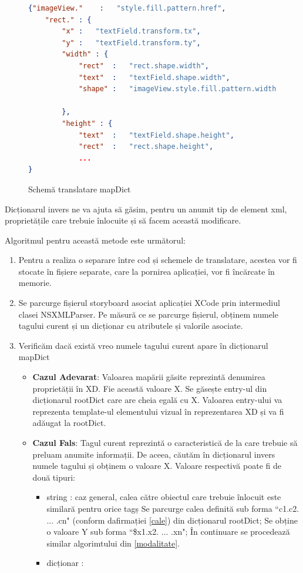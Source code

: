 \begin{figure}[!htbp]
\begin{lstlisting}[language=json,firstnumber=1]
{"imageView."    :   "style.fill.pattern.href",
    "rect." : {
        "x" :   "textField.transform.tx",
        "y" :   "textField.transform.ty",
        "width" : {
            "rect"  :   "rect.shape.width",
            "text"  :   "textField.shape.width",
            "shape" :   "imageView.style.fill.pattern.width"
        
        },
        "height" : {
            "text"  :   "textField.shape.height",
            "rect"  :   "rect.shape.height",
            ...
}
\end{lstlisting}
\caption{Schemă translatare mapDict} \label{fig:MapDict Schema}
\end{figure}


Dicționarul invers ne va ajuta să găsim, pentru un anumit tip de element xml, proprietățile care trebuie înlocuite și să facem această modificare. 

Algoritmul pentru această metode este următorul:

\begin{enumerate}
\item Pentru a realiza o separare între cod și schemele de translatare, acestea vor fi stocate în fișiere separate, care la pornirea aplicației, vor fi încărcate în memorie.
\item Se parcurge fișierul storyboard asociat aplicației XCode prin intermediul clasei NSXMLParser. Pe măsură ce se parcurge fișierul, obținem numele tagului curent și un dicționar cu atributele și valorile asociate.
\item Verificăm dacă există vreo numele tagului curent apare în dicționarul mapDict
\begin{itemize}
\item \textbf{Cazul Adevarat}: Valoarea mapării găsite reprezintă denumirea proprietății în XD. Fie această valoare X. Se găsește entry-ul din dicționarul rootDict care are cheia egală cu X. Valoarea entry-ului va reprezenta template-ul elementului vizual în reprezentarea XD și va fi adăugat la rootDict.
\item \textbf{Cazul Fals}: Tagul curent reprezintă o caracteristică de la care trebuie să preluam anumite informații. De aceea, căutăm în dicționarul invers numele tagului și obținem o valoare X. Valoare respectivă poate fi de două tipuri:
\begin{itemize}
\item string : caz general, calea către obiectul care trebuie înlocuit este similară pentru orice tagș Se parcurge calea definită sub forma ``c1.c2. ... .cn" (conform dafirmației \ref{cale}) din dicționarul rootDict; Se obține o valoare Y sub forma ``\$x1.x2. ... .xn"; În continuare se procedează similar algorimtului din \ref{modalitate}.
\item dicționar :
\end{itemize}
\end{itemize}
\end{enumerate}



